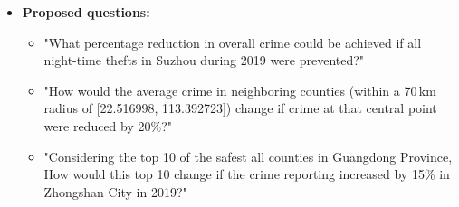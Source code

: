 \begin{itemize}
        \item \textbf{Proposed questions:}
        \begin{itemize}
            \item "What percentage reduction in overall crime could be achieved if all night-time thefts in Suzhou during 2019 were prevented?"
            \item "How would the average crime in neighboring counties (within a 70 km radius of [22.516998, 113.392723]) change if crime at that central point were reduced by 20\%?"
            \item "Considering the top 10 of the safest all counties in Guangdong Province, How would this top 10 change if the crime reporting increased by 15\% in Zhongshan City in 2019?"
        \end{itemize}
\end{itemize}

